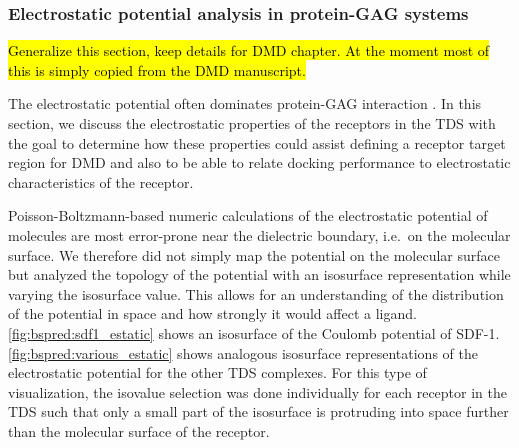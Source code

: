 \subsubsection{Electrostatic potential analysis in protein-GAG systems}

\hl{Generalize this section, keep details for DMD chapter. At the moment most of
this is simply copied from the DMD manuscript.}

The electrostatic potential often dominates protein-GAG interaction
\cite{gandhi_structure_2008}. In this section, we discuss the electrostatic
properties of the receptors in the TDS with the goal to determine how these
properties could assist defining a receptor target region for DMD and also to be
able to relate docking performance to electrostatic characteristics of the
receptor.


Poisson-Boltzmann-based numeric calculations of the electrostatic potential of
molecules are most error-prone near the dielectric boundary, i.e.\ on the
molecular surface. We therefore did not simply map the potential on the
molecular surface but analyzed the topology of the potential with an isosurface
representation while varying the isosurface value. This allows for an
understanding  of the distribution of the potential in space and how strongly it
would affect a ligand. \cref{fig:bspred:sdf1_estatic} shows an isosurface of the
Coulomb potential of SDF-1. \cref{fig:bspred:various_estatic} shows analogous
isosurface representations of the electrostatic potential for the other TDS
complexes. For this type of visualization, the isovalue selection was done
individually for each receptor in the TDS such that only a small part of the
isosurface is protruding into space further than the molecular surface of the
receptor.



